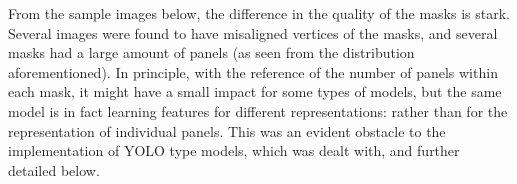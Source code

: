 \documentclass[conference]{IEEEtran}
\begin{document}
%
%

From the sample images below, the difference in the quality of the masks is stark. Several images were found to have misaligned vertices of the masks, and several masks had a large amount of panels (as seen from the distribution aforementioned). In principle, with the reference of the number of panels within each mask, it might have a small impact for some types of models, but the same model is in fact learning features for different representations: rather than for the representation of individual panels. This was an evident obstacle to the implementation of YOLO type models, which was dealt with, and further detailed below.
\end{document}
